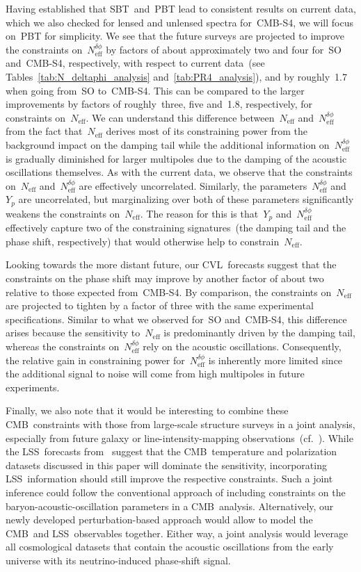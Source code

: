 \documentclass[11pt]{article}
\numberwithin{equation}{section}
\newcommand{\Neff}{N_\mathrm{eff}}
\newcommand{\Nphase}{N_\mathrm{eff}^{\delta\phi}}
\begin{document}
Having established that SBT~and~PBT lead to consistent results on current data, which we also checked for lensed and unlensed spectra for~\mbox{CMB-S4}, we will focus on~PBT for simplicity. We see that the future surveys are projected to improve the constraints on~$\Nphase$ by factors of about approximately two and four for~SO and~\mbox{CMB-S4}, respectively, with respect to current data~(see Tables~\ref{tab:N_deltaphi_analysis} and~\ref{tab:PR4_analysis}), and by roughly~1.7 when going from~SO to~\mbox{CMB-S4}. This can be compared to the larger improvements by factors of roughly~three, five and~1.8, respectively, for constraints on~$\Neff$. We can understand this difference between~$\Neff$ and~$\Nphase$ from the fact that~$\Neff$ derives most of its constraining power from the background impact on the damping tail while the additional information on~$\Nphase$ is gradually diminished for larger multipoles due to the damping of the acoustic oscillations themselves. As with the current data, we observe that the constraints on~$\Neff$ and~$\Nphase$ are effectively uncorrelated. Similarly, the parameters~$\Nphase$ and~$Y_p$ are uncorrelated, but marginalizing over both of these parameters significantly weakens the constraints on~$\Neff$. The reason for this is that~$Y_p$ and~$\Nphase$ effectively capture two of the constraining signatures~(the damping tail and the phase shift, respectively) that would otherwise help to constrain~$\Neff$.

Looking towards the more distant future, our CVL~forecasts suggest that the constraints on the phase shift may improve by another factor of about two relative to those expected from~\mbox{CMB-S4}. By comparison, the constraints on~$\Neff$ are projected to tighten by a factor of three with the same experimental specifications. Similar to what we observed for~SO and~\mbox{CMB-S4}, this difference arises because the sensitivity to~$\Neff$ is predominantly driven by the damping tail, whereas the constraints on~$\Nphase$ rely on the acoustic oscillations. Consequently, the relative gain in constraining power for~$\Nphase$ is inherently more limited since the additional signal to noise will come from high multipoles in future experiments.\medskip

Finally, we also note that it would be interesting to combine these CMB~constraints with those from large-scale structure surveys in a joint analysis, especially from future galaxy or line-intensity-mapping observations~(cf.~\cite{CosmicVisions21cm:2018rfq, PUMA:2019jwd, Karkare:2022bai, DESI:2022lza, Schlegel:2022vrv}). While the LSS~forecasts from~\cite{Baumann:2017gkg} suggest that the CMB~temperature and polarization datasets discussed in this paper will dominate the sensitivity, incorporating LSS~information should still improve the respective constraints. Such a joint inference could follow the conventional approach of including constraints on the baryon-acoustic-oscillation parameters in a CMB~analysis. Alternatively, our newly developed perturbation-based approach would allow to model the CMB~and LSS~observables together. Either way, a joint analysis would leverage all cosmological datasets that contain the acoustic oscillations from the early universe with its neutrino-induced phase-shift signal.
\end{document}
